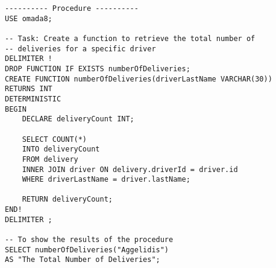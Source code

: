 \begin{lstlisting}
---------- Procedure ----------
USE omada8;

-- Task: Create a function to retrieve the total number of 
-- deliveries for a specific driver
DELIMITER !
DROP FUNCTION IF EXISTS numberOfDeliveries;
CREATE FUNCTION numberOfDeliveries(driverLastName VARCHAR(30))
RETURNS INT
DETERMINISTIC
BEGIN
    DECLARE deliveryCount INT;

    SELECT COUNT(*)
    INTO deliveryCount
    FROM delivery
    INNER JOIN driver ON delivery.driverId = driver.id
    WHERE driverLastName = driver.lastName;

    RETURN deliveryCount;
END!
DELIMITER ;

-- To show the results of the procedure
SELECT numberOfDeliveries("Aggelidis") 
AS "The Total Number of Deliveries";
\end{lstlisting}